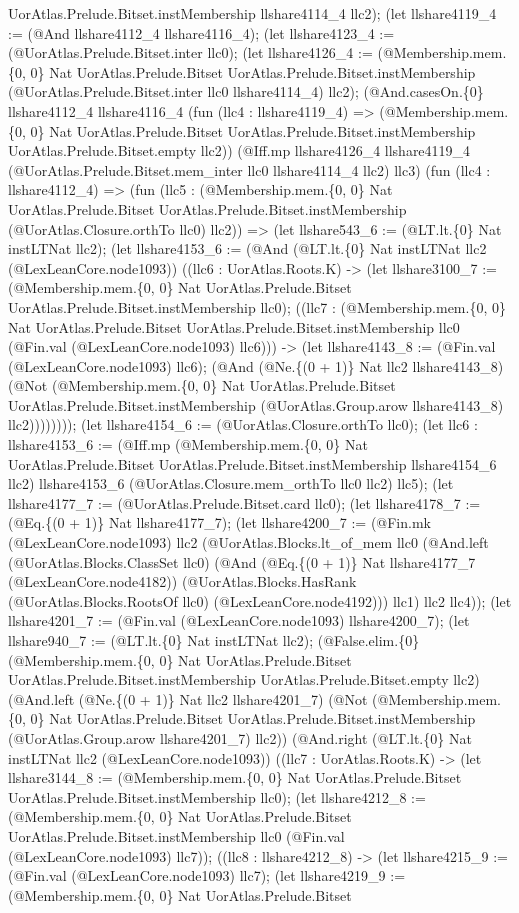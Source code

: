 \documentclass[11pt]{article}
\begin{document}
UorAtlas.Prelude.Bitset.instMembership llshare4114\_4 llc2); (let llshare4119\_4 := (@And llshare4112\_4 llshare4116\_4); (let llshare4123\_4 := (@UorAtlas.Prelude.Bitset.inter llc0); (let llshare4126\_4 := (@Membership.mem.\{0, 0\} Nat UorAtlas.Prelude.Bitset UorAtlas.Prelude.Bitset.instMembership (@UorAtlas.Prelude.Bitset.inter llc0 llshare4114\_4) llc2); (@And.casesOn.\{0\} llshare4112\_4 llshare4116\_4 (fun (llc4 : llshare4119\_4) => (@Membership.mem.\{0, 0\} Nat UorAtlas.Prelude.Bitset UorAtlas.Prelude.Bitset.instMembership UorAtlas.Prelude.Bitset.empty llc2)) (@Iff.mp llshare4126\_4 llshare4119\_4 (@UorAtlas.Prelude.Bitset.mem\_inter llc0 llshare4114\_4 llc2) llc3) (fun (llc4 : llshare4112\_4) => (fun (llc5 : (@Membership.mem.\{0, 0\} Nat UorAtlas.Prelude.Bitset UorAtlas.Prelude.Bitset.instMembership (@UorAtlas.Closure.orthTo llc0) llc2)) => (let llshare543\_6 := (@LT.lt.\{0\} Nat instLTNat llc2); (let llshare4153\_6 := (@And (@LT.lt.\{0\} Nat instLTNat llc2 (@LexLeanCore.node1093)) ((llc6 : UorAtlas.Roots.K) -> (let llshare3100\_7 := (@Membership.mem.\{0, 0\} Nat UorAtlas.Prelude.Bitset UorAtlas.Prelude.Bitset.instMembership llc0); ((llc7 : (@Membership.mem.\{0, 0\} Nat UorAtlas.Prelude.Bitset UorAtlas.Prelude.Bitset.instMembership llc0 (@Fin.val (@LexLeanCore.node1093) llc6))) -> (let llshare4143\_8 := (@Fin.val (@LexLeanCore.node1093) llc6); (@And (@Ne.\{(0 + 1)\} Nat llc2 llshare4143\_8) (@Not (@Membership.mem.\{0, 0\} Nat UorAtlas.Prelude.Bitset UorAtlas.Prelude.Bitset.instMembership (@UorAtlas.Group.arow llshare4143\_8) llc2)))))))); (let llshare4154\_6 := (@UorAtlas.Closure.orthTo llc0); (let llc6 : llshare4153\_6 := (@Iff.mp (@Membership.mem.\{0, 0\} Nat UorAtlas.Prelude.Bitset UorAtlas.Prelude.Bitset.instMembership llshare4154\_6 llc2) llshare4153\_6 (@UorAtlas.Closure.mem\_orthTo llc0 llc2) llc5); (let llshare4177\_7 := (@UorAtlas.Prelude.Bitset.card llc0); (let llshare4178\_7 := (@Eq.\{(0 + 1)\} Nat llshare4177\_7); (let llshare4200\_7 := (@Fin.mk (@LexLeanCore.node1093) llc2 (@UorAtlas.Blocks.lt\_of\_mem llc0 (@And.left (@UorAtlas.Blocks.ClassSet llc0) (@And (@Eq.\{(0 + 1)\} Nat llshare4177\_7 (@LexLeanCore.node4182)) (@UorAtlas.Blocks.HasRank (@UorAtlas.Blocks.RootsOf llc0) (@LexLeanCore.node4192))) llc1) llc2 llc4)); (let llshare4201\_7 := (@Fin.val (@LexLeanCore.node1093) llshare4200\_7); (let llshare940\_7 := (@LT.lt.\{0\} Nat instLTNat llc2); (@False.elim.\{0\} (@Membership.mem.\{0, 0\} Nat UorAtlas.Prelude.Bitset UorAtlas.Prelude.Bitset.instMembership UorAtlas.Prelude.Bitset.empty llc2) (@And.left (@Ne.\{(0 + 1)\} Nat llc2 llshare4201\_7) (@Not (@Membership.mem.\{0, 0\} Nat UorAtlas.Prelude.Bitset UorAtlas.Prelude.Bitset.instMembership (@UorAtlas.Group.arow llshare4201\_7) llc2)) (@And.right (@LT.lt.\{0\} Nat instLTNat llc2 (@LexLeanCore.node1093)) ((llc7 : UorAtlas.Roots.K) -> (let llshare3144\_8 := (@Membership.mem.\{0, 0\} Nat UorAtlas.Prelude.Bitset UorAtlas.Prelude.Bitset.instMembership llc0); (let llshare4212\_8 := (@Membership.mem.\{0, 0\} Nat UorAtlas.Prelude.Bitset UorAtlas.Prelude.Bitset.instMembership llc0 (@Fin.val (@LexLeanCore.node1093) llc7)); ((llc8 : llshare4212\_8) -> (let llshare4215\_9 := (@Fin.val (@LexLeanCore.node1093) llc7); (let llshare4219\_9 := (@Membership.mem.\{0, 0\} Nat UorAtlas.Prelude.Bitset 
\end{document}
